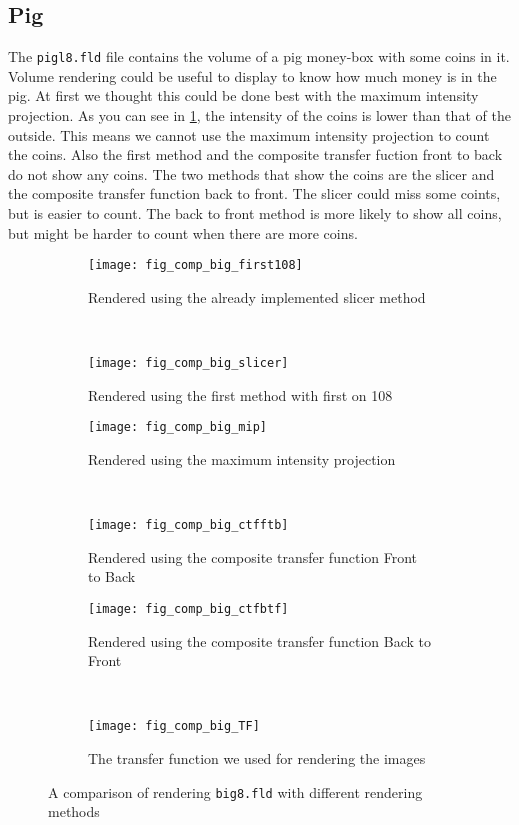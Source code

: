 \subsection{Pig}
The \texttt{pigl8.fld} file contains the volume of a pig money-box with some coins in it.
Volume rendering could be useful to display to know how much money is in the pig.
At first we thought this could be done best with the maximum intensity projection.
As you can see in \ref{fig:comp:big}, the intensity of the coins is lower than that of the outside. 
This means we cannot use the maximum intensity projection to count the coins. 
Also the first method and the composite transfer fuction front to back do not show any coins. 
The two methods that show the coins are the slicer and the composite transfer function back to front. 
The slicer could miss some coints, but is easier to count. 
The back to front method is more likely to show all coins, but might be harder to count when there are more coins. 
\begin{figure}[H]
	\centering
	\begin{subfigure}[t]{0.45\textwidth}
		\texttt{[image: fig\_comp\_big\_first108]}
		\caption{Rendered using the already implemented slicer method}
	\end{subfigure}
	~%
	\begin{subfigure}[t]{0.45\textwidth}
		\texttt{[image: fig\_comp\_big\_slicer]}
		\caption{Rendered using the first method with first on 108}
	\end{subfigure}
	
	\begin{subfigure}[t]{0.45\textwidth}
		\texttt{[image: fig\_comp\_big\_mip]}
		\caption{Rendered using the maximum intensity projection}
	\end{subfigure}
	~%
	\begin{subfigure}[t]{0.45\textwidth}
		\texttt{[image: fig\_comp\_big\_ctfftb]}
		\caption{Rendered using the composite transfer function Front to Back}
	\end{subfigure}

	\begin{subfigure}[t]{0.45\textwidth}
		\texttt{[image: fig\_comp\_big\_ctfbtf]}
		\caption{Rendered using the composite transfer function Back to Front}
	\end{subfigure}
	~%
	\begin{subfigure}[t]{0.45\textwidth}
		\texttt{[image: fig\_comp\_big\_TF]}
		\caption{The transfer function we used for rendering the images}
	\end{subfigure}
	
	\caption{A comparison of rendering \texttt{big8.fld} with different rendering methods}
	\label{fig:comp:big}
\end{figure}